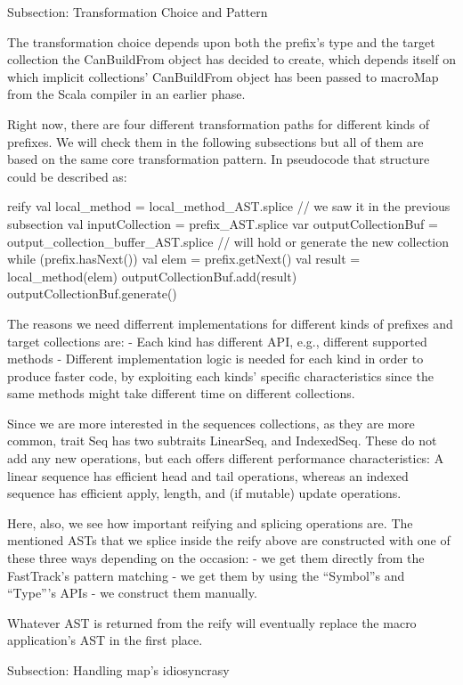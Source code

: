 Subsection: Transformation Choice and Pattern

The transformation choice depends upon both the prefix's type and  the
target collection the CanBuildFrom object has decided to create, which depends
itself on which implicit collections' CanBuildFrom object has been passed to
macroMap from the Scala compiler in an earlier phase.

Right now, there are four different transformation paths for different kinds of
prefixes. We will check them in the following subsections but all of them are
based on the same core transformation pattern. In pseudocode that structure
could be described as:

reify {
  val local_method = local_method_AST.splice // we saw it in the previous
subsection
  val inputCollection = prefix_AST.splice
  var outputCollectionBuf = output_collection_buffer_AST.splice // will
hold or generate the new collection
  while (prefix.hasNext()) {
    val elem = prefix.getNext()
    val result = local_method(elem)
    outputCollectionBuf.add(result)
  }
  outputCollectionBuf.generate()
}

The reasons we need differrent implementations for different kinds of
prefixes and target collections are:
- Each kind has different API, e.g., different supported methods
- Different implementation logic is needed for each kind in order to produce
faster code, by exploiting each kinds' specific characteristics since the same
methods might take different time on different collections.

Since we are more interested in the sequences collections, as they are more
common, trait Seq has two subtraits LinearSeq, and IndexedSeq. These do not add
any new operations, but each offers different performance characteristics: A
linear sequence has efficient head and tail operations, whereas an indexed
sequence has efficient apply, length, and (if mutable) update operations. 

Here, also, we see how important reifying and splicing operations are. The
mentioned ASTs that we splice inside the reify above are constructed with one of
these three ways depending on the occasion:
- we get them directly from the FastTrack's pattern matching
- we get them by using the ``Symbol''s and ``Type'''s APIs
- we construct them manually.

Whatever AST is returned from the reify will eventually replace the macro
application's AST in the first place.


Subsection: Handling map's idiosyncrasy

